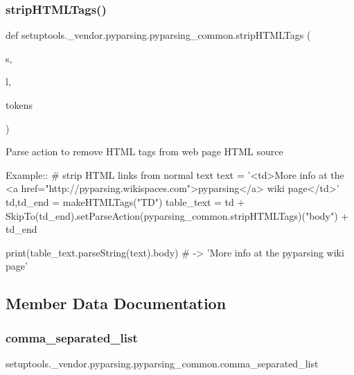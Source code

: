 \subsubsection{\texorpdfstring{strip\+H\+T\+M\+L\+Tags()}{stripHTMLTags()}}
{\footnotesize\ttfamily def setuptools.\+\_\+vendor.\+pyparsing.\+pyparsing\+\_\+common.\+strip\+H\+T\+M\+L\+Tags (\begin{DoxyParamCaption}\item[{}]{s,  }\item[{}]{l,  }\item[{}]{tokens }\end{DoxyParamCaption})\hspace{0.3cm}{\ttfamily [static]}}

\begin{DoxyVerb}Parse action to remove HTML tags from web page HTML source

Example::
    # strip HTML links from normal text 
    text = '<td>More info at the <a href="http://pyparsing.wikispaces.com">pyparsing</a> wiki page</td>'
    td,td_end = makeHTMLTags("TD")
    table_text = td + SkipTo(td_end).setParseAction(pyparsing_common.stripHTMLTags)("body") + td_end
    
    print(table_text.parseString(text).body) # -> 'More info at the pyparsing wiki page'
\end{DoxyVerb}
 

\subsection{Member Data Documentation}
\mbox{\label{classsetuptools_1_1__vendor_1_1pyparsing_1_1pyparsing__common_a04dc0d91b9cd70ab9f46b65302681d5a}} 
\subsubsection{\texorpdfstring{comma\+\_\+separated\+\_\+list}{comma\_separated\_list}}
{\footnotesize\ttfamily setuptools.\+\_\+vendor.\+pyparsing.\+pyparsing\+\_\+common.\+comma\+\_\+separated\+\_\+list\hspace{0.3cm}{\ttfamily [static]}}


